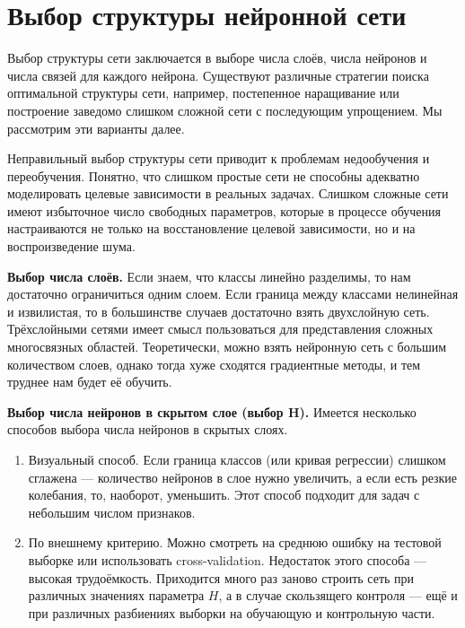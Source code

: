 \documentclass{article}
\begin{document}
	\section{Выбор структуры нейронной сети}
	
	Выбор структуры сети заключается в выборе числа слоёв, числа нейронов и числа связей для каждого нейрона. Существуют различные стратегии поиска оптимальной структуры сети, например, постепенное наращивание или построение заведомо слишком сложной сети с последующим упрощением. Мы рассмотрим эти варианты далее.
	
	Неправильный выбор структуры сети приводит к проблемам недообучения и переобучения. Понятно, что слишком простые сети не способны адекватно моделировать целевые зависимости в реальных задачах. Слишком сложные сети имеют избыточное число свободных параметров, которые в процессе обучения настраиваются не только на восстановление целевой зависимости, но и на воспроизведение шума.
	
	\textbf{Выбор числа слоёв.} Если знаем, что классы линейно разделимы, то нам достаточно ограничиться одним слоем. Если граница между классами нелинейная и извилистая, то в большинстве случаев достаточно взять двухслойную сеть. Трёхслойными сетями имеет смысл пользоваться для представления сложных многосвязных областей. Теоретически, можно взять нейронную сеть с большим количеством слоев, однако тогда хуже сходятся градиентные методы, и тем труднее нам будет её обучить.
	
	\textbf{Выбор числа нейронов в скрытом слое (выбор H).} Имеется несколько способов выбора числа нейронов в скрытых слоях.
	\begin{enumerate}
		\item Визуальный способ. Если граница классов (или кривая регрессии) слишком сглажена --- количество нейронов в слое нужно увеличить, а если есть резкие колебания, то, наоборот, уменьшить. Этот способ подходит для задач с небольшим числом признаков.
		\item По внешнему критерию. Можно смотреть на среднюю ошибку на тестовой выборке или использовать cross-validation. Недостаток этого способа --- высокая трудоёмкость. Приходится много раз заново строить сеть при различных значениях параметра $H$, а в случае скользящего контроля --- ещё и при различных разбиениях выборки на обучающую и контрольную части.
	
	\end{enumerate}
	
\end{document}
